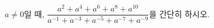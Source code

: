 $a\ne 0$일 때, $\dfrac{a^{2}+a^{4}+a^{6}+a^{8}+a^{10}}{a^{-1}+a^{-3}+a^{-5}+a^{-7}+a^{-9}}$을 간단히 하시오.
